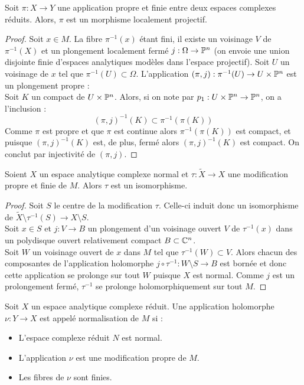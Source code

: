 \documentclass[a4page,10pt]{article}
\begin{document}
\begin{Lemme}
Soit $\pi : X\to Y$ une application propre et finie entre deux espaces complexes r\'eduits. Alors, $\pi$ est un morphisme localement projectif.
\end{Lemme}

\begin{proof}
  Soit $x \in M$. La fibre $\pi^{-1}(x)$ \'etant fini, il existe un voisinage $V$ de $\pi^{-1}(X)$ et un plongement localement ferm\'e $j : \Omega \to \P^n$ (on envoie une union disjointe finie d'espaces analytiques mod\`eles dans l'espace projectif). Soit $U$ un voisinage de $x$ tel que $\pi^{-1}(U) \subset \Omega$. L'application $(\pi,j) : \pi^{-1}(U) \to U\times \P^n$ est un plongement propre : \\
  Soit $K$ un compact de $U \times \P^n$. Alors, si on note par $p_1 : U \times \P^n \to \P^n$, on a l'inclusion :
  \[
    (\pi,j)^{-1}(K) \subset \pi^{-1}(\pi(K))
    \]
Comme $\pi$ est propre et que $\pi$ est continue alors $\pi^{-1}(\pi(K))$ est compact, et puisque $ (\pi,j)^{-1}(K)$ est, de plus, ferm\'e alors $(\pi,j)^{-1}(K)$ est compact. On conclut par injectivit\'e de $(\pi,j)$.
\end{proof}
\begin{Lemme}
Soient $X$ un espace analytique complexe normal et $\tau : \widetilde{X} \to X$ une modification propre et finie de $M$. Alors $\tau$ est un isomorphisme.
\end{Lemme}

\begin{proof}
  Soit $S$ le centre de la modification $\tau$. Celle-ci induit donc un isomorphisme de $\widetilde{X} \setminus \tau^{-1}(S) \to X \setminus S$. \\
  Soit $x \in S$ et $j : V \to B$ un plongement d'un voisinage ouvert $V$ de $\tau^{-1}(x)$ dans un polydisque ouvert relativement compact $B \subset \C^n$. \\
  Soit $W$ un voisinage ouvert de $x$ dans $M$ tel que $\tau^{-1}(W) \subset V$. Alors chacun des composantes de l'application holomorphe $j \circ \tau^{-1}: W \setminus S \to B$ est born\'ee et donc cette application se prolonge sur tout $W$ puisque $X$ est normal. Comme $j$ est un prolongement ferm\'e, $\tau^{-1}$ se prolonge holomorphiquement sur tout $M$. 
  \end{proof}

\begin{Def}
  Soit $X$ un espace analytique complexe r\'eduit. Une application holomorphe $\nu:Y \to X$ est appel\'e normalisation de $M$ si :
  \begin{itemize}
  \item L'espace complexe r\'eduit $N$ est normal.
  \item L'application $\nu$ est une modification propre de $M$.
  \item Les fibres de $\nu$ sont finies.
  \end{itemize}
  
\end{Def}
\end{document}
